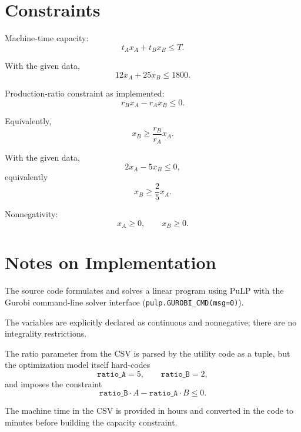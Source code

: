 \section*{Constraints}

Machine-time capacity:
\[
t_A x_A + t_B x_B \le T.
\]

With the given data,
\[
12x_A + 25x_B \le 1800.
\]

Production-ratio constraint as implemented:
\[
r_B x_A - r_A x_B \le 0.
\]

Equivalently,
\[
x_B \ge \frac{r_B}{r_A}x_A.
\]

With the given data,
\[
2x_A - 5x_B \le 0,
\]
equivalently
\[
x_B \ge \frac{2}{5}x_A.
\]

Nonnegativity:
\[
x_A \ge 0,\qquad x_B \ge 0.
\]

\section*{Notes on Implementation}

The source code formulates and solves a linear program using PuLP with the Gurobi command-line solver interface (\texttt{pulp.GUROBI\_CMD(msg=0)}).

The variables are explicitly declared as continuous and nonnegative; there are no integrality restrictions.

The ratio parameter from the CSV is parsed by the utility code as a tuple, but the optimization model itself hard-codes
\[
\texttt{ratio\_A}=5,\qquad \texttt{ratio\_B}=2,
\]
and imposes the constraint
\[
\texttt{ratio\_B} \cdot A - \texttt{ratio\_A} \cdot B \le 0.
\]

The machine time in the CSV is provided in hours and converted in the code to minutes before building the capacity constraint.
